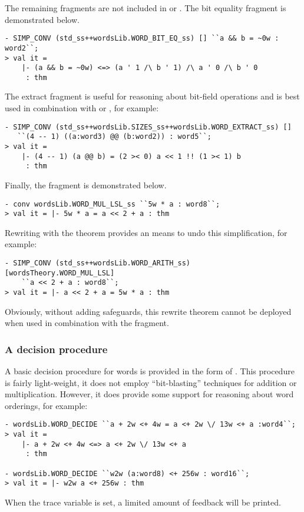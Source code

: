 The remaining fragments are not included in  or .  The bit equality fragment is demonstrated below.
\begin{session}
\begin{verbatim}
- SIMP_CONV (std_ss++wordsLib.WORD_BIT_EQ_ss) [] ``a && b = ~0w : word2``;
> val it =
    |- (a && b = ~0w) <=> (a ' 1 /\ b ' 1) /\ a ' 0 /\ b ' 0
     : thm
\end{verbatim}
\end{session}
The extract fragment is useful for reasoning about bit-field operations and is best used in combination with  or , for example:
\begin{session}
\begin{verbatim}
- SIMP_CONV (std_ss++wordsLib.SIZES_ss++wordsLib.WORD_EXTRACT_ss) []
   ``(4 -- 1) ((a:word3) @@ (b:word2)) : word5``;
> val it =
    |- (4 -- 1) (a @@ b) = (2 >< 0) a << 1 !! (1 >< 1) b
     : thm
\end{verbatim}
\end{session}
Finally, the fragment  is demonstrated below.
\begin{session}
\begin{verbatim}
- conv wordsLib.WORD_MUL_LSL_ss ``5w * a : word8``;
> val it = |- 5w * a = a << 2 + a : thm
\end{verbatim}
\end{session}
Rewriting with the theorem  provides an means to undo this simplification, for example:
\begin{session}
\begin{verbatim}
- SIMP_CONV (std_ss++wordsLib.WORD_ARITH_ss) [wordsTheory.WORD_MUL_LSL]
    ``a << 2 + a : word8``;
> val it = |- a << 2 + a = 5w * a : thm
\end{verbatim}
\end{session}
Obviously, without adding safeguards, this rewrite theorem cannot be deployed when used in combination with the  fragment.

\subsubsection{A decision procedure}

A basic decision procedure for words is provided in the form of .  This procedure is fairly light-weight, \eg{} it does not employ ``bit-blasting'' techniques for addition or multiplication.  However, it does provide some support for reasoning about word orderings, for example:
\begin{session}
\begin{verbatim}
- wordsLib.WORD_DECIDE ``a + 2w <+ 4w = a <+ 2w \/ 13w <+ a :word4``;
> val it =
    |- a + 2w <+ 4w <=> a <+ 2w \/ 13w <+ a
     : thm

- wordsLib.WORD_DECIDE ``w2w (a:word8) <+ 256w : word16``;
> val it = |- w2w a <+ 256w : thm
\end{verbatim}
\end{session}
When the trace variable  is set, a limited amount of feedback will be printed.

